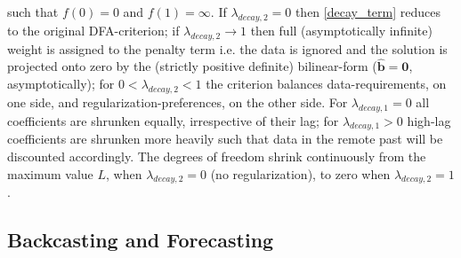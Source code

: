 \documentclass[a4paper]{book}
\begin{document}
such that $f(0)=0$ and $f(1)=\infty$. If $\lambda_{decay,2}=0$ then \ref{decay_term} reduces to the original DFA-criterion; if $\lambda_{decay,2}\to 1$ then full (asymptotically infinite) weight is assigned to the penalty term i.e. the data is ignored and the solution is projected onto zero by the (strictly positive definite) bilinear-form ($\mathbf{\hat{b}}=\mathbf{0}$, asymptotically); for $0<\lambda_{decay,2}<1$ the criterion balances data-requirements, on one side, and regularization-preferences, on the other side. For $\lambda_{decay,1}=0$ all coefficients are shrunken equally, irrespective of their lag; for $\lambda_{decay,1}>0$ high-lag coefficients are shrunken more heavily such that data in the remote past will be discounted accordingly. The degrees of freedom shrink continuously from the maximum value $L$, when $\lambda_{decay,2}=0$ (no regularization), to zero when $\lambda_{decay,2}=1$.




\subsection{Backcasting and Forecasting}\label{now_for_bac_reg}
\end{document}
